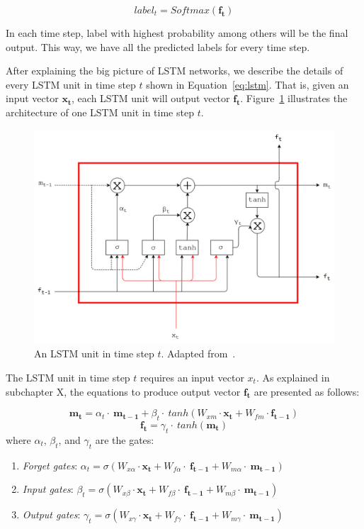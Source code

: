 \begin{equation}
\label{eq:softmaxout}
label_{t} = Softmax(\mathbf{f_{t}})
\end{equation}

In each time step, label with highest probability among others will be the final output. This way, we have all the predicted labels for every time step.

After explaining the big picture of LSTM networks, we describe the details of every LSTM unit in time step $t$ shown in Equation~\ref{eq:lstm}. That is, given an input vector $\mathbf{x_{t}}$, each LSTM unit will output vector $\mathbf{f_{t}}$. Figure~\ref{fig:lstmunit} illustrates the architecture of one LSTM unit in time step $t$.

\begin{figure}
	\centering
	\includegraphics[width=0.85\linewidth]{images/lstmadapted2}
	\caption{An LSTM unit in time step $t$. Adapted from~\citep{skripsiwahid}.}
	\label{fig:lstmunit}
\end{figure}

The LSTM unit in time step $t$ requires an input vector $x_{t}$. As explained in subchapter X, the equations to produce output vector $\mathbf{f_{t}}$ are presented as follows:

\begin{equation}\label{eq:lstmm}
\mathbf{m_{t}}=\alpha_{t}\cdot~\mathbf{m_{t-1}} + \beta_{t}\cdot~tanh(W_{xm} \cdot \mathbf{x_{t}} + W_{fm} \cdot \mathbf{f_{t-1}})
\end{equation}
\begin{equation}\label{eq:lstmh}
\mathbf{f_{t}}=\gamma_{t}\cdot~tanh(\mathbf{m_{t}})
\end{equation}
where
$ \alpha_t $, $ \beta_t $, and $ \gamma_t $ are the gates:
\begin{enumerate}
	\item \textit{Forget gates}: $ \alpha_{t}=\sigma(W_{x\alpha} \cdot \mathbf{x_{t}}+W_{f\alpha}\cdot~\mathbf{f_{t-1}}+W_{m\alpha}\cdot~\mathbf{m_{t-1}}) $
	\item \textit{Input gates}: $ \beta_{t}=\sigma(W_{x\beta}\cdot \mathbf{x_{t}}+W_{f\beta}\cdot~\mathbf{f_{t-1}}+W_{m\beta}\cdot~\mathbf{m_{t-1}}) $
	\item \textit{Output gates}: $ \gamma_{t}=\sigma(W_{x\gamma}\cdot \mathbf{x_{t}}+W_{f\gamma}\cdot~\mathbf{f_{t-1}}+W_{m\gamma}\cdot~\mathbf{m_{t-1}}) $
\end{enumerate}

